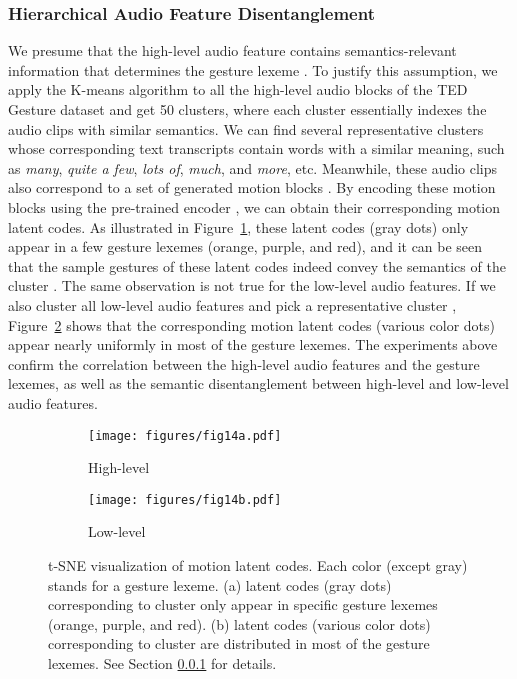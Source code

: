 \documentclass[acmtog,authorversion]{acmart}
\newcommand{\fig}{Figure{}~}
\begin{document}
\subsubsection{Hierarchical Audio Feature Disentanglement}
\label{subsubsec:disentanglement}
We presume that the high-level audio feature  contains semantics-relevant information that determines the gesture lexeme .
To justify this assumption, we apply the K-means algorithm to all the high-level audio blocks of the TED Gesture dataset and get 50 clusters, where each cluster essentially indexes the audio clips with similar semantics. We can find several representative clusters  whose corresponding text transcripts contain words with a similar meaning, such as \emph{many}, \emph{quite a few}, \emph{lots of}, \emph{much}, and \emph{more}, etc. Meanwhile, these audio clips also correspond to a set of generated motion blocks . By encoding these motion blocks using the pre-trained encoder , we can obtain their corresponding motion latent codes. As illustrated in \fig\ref{fig:fig14a}, these latent codes (gray dots) only appear in a few gesture lexemes (orange, purple, and red), and it can be seen that the sample gestures of these latent codes indeed convey the semantics of the cluster .
The same observation is not true for the low-level audio features. If we also cluster all low-level audio features and pick a representative cluster , \fig\ref{fig:fig14b} shows that the corresponding motion latent codes (various color dots) appear nearly uniformly in most of the gesture lexemes.
The experiments above confirm the correlation between the high-level audio features and the gesture lexemes, as well as the semantic disentanglement between high-level and low-level audio features.

\begin{figure}[t]
    \centering
    \begin{subfigure}[t]{0.62\linewidth}
        \centering
        \texttt{[image: figures/fig14a.pdf]}
        \caption{High-level}
        \label{fig:fig14a}
    \end{subfigure} 
    \hspace{\fill}
    \begin{subfigure}[t]{0.3554\linewidth}
        \centering
        \texttt{[image: figures/fig14b.pdf]}
        \caption{Low-level}
        \label{fig:fig14b}
    \end{subfigure} 
    \caption{t-SNE visualization of motion latent codes. Each color (except gray) stands for a gesture lexeme. 
    (a) latent codes (gray dots) corresponding to cluster  only appear in specific gesture lexemes (orange, purple, and red).
    (b) latent codes (various color dots) corresponding to cluster  are distributed in most of the gesture lexemes.
    See Section \ref{subsubsec:disentanglement} for details.}
    \label{fig:fig14}
    \Description{}
\end{figure}
\end{document}
